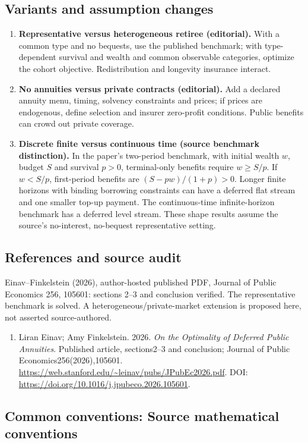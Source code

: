 \documentclass[11pt,a4paper]{article}
\begin{document}
\subsection*{Variants and assumption changes}
\begin{enumerate}
\item \textbf{Representative versus heterogeneous retiree (editorial).} With a common type and no bequests, use the published benchmark; with type-dependent survival and wealth and common observable categories, optimize the cohort objective. Redistribution and longevity insurance interact.
\item \textbf{No annuities versus private contracts (editorial).} Add a declared annuity menu, timing, solvency constraints and prices; if prices are endogenous, define selection and insurer zero-profit conditions. Public benefits can crowd out private coverage.
\item \textbf{Discrete finite versus continuous time (source benchmark distinction).} In the paper's two-period benchmark, with initial wealth \(w\), budget \(S\) and survival \(p>0\), terminal-only benefits require \(w\geq S/p\). If \(w<S/p\), first-period benefits are \((S-pw)/(1+p)>0\). Longer finite horizons with binding borrowing constraints can have a deferred flat stream and one smaller top-up payment. The continuous-time infinite-horizon benchmark has a deferred level stream. These shape results assume the source's no-interest, no-bequest representative setting.
\end{enumerate}
\subsection*{References and source audit}
Einav--Finkelstein (2026), author-hosted published PDF, Journal of Public Economics 256, 105601: sections 2--3 and conclusion verified. The representative benchmark is solved. A heterogeneous/private-market extension is proposed here, not asserted source-authored.
\begin{enumerate}\raggedright
\item\hypertarget{definitions:source:30007761:1}{} Liran Einav; Amy Finkelstein. 2026. \emph{On the Optimality of Deferred Public Annuities}. Published article, sections2–3 and conclusion; Journal of Public Economics256(2026),105601.
\url{https://web.stanford.edu/~leinav/pubs/JPubEc2026.pdf}.
DOI: \url{https://doi.org/10.1016/j.jpubeco.2026.105601}.
\end{enumerate}

\subsection*{Common conventions: Source mathematical conventions}
\end{document}
